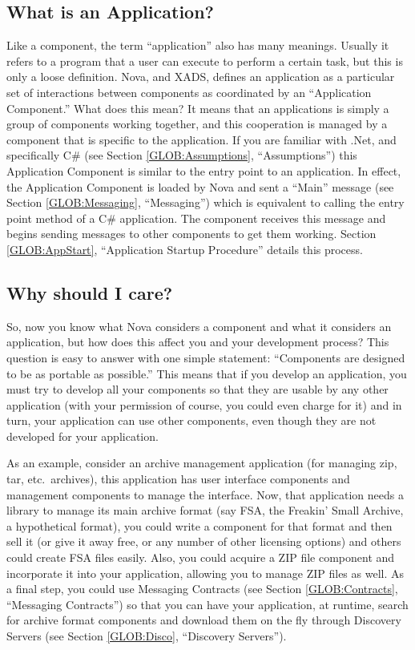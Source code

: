 \documentclass[a4paper,12pt]{article}
\begin{document}
\subsection{What is an Application?}
\label{SEC:OVR:App}
Like a component, the term ``application'' also has many meanings. Usually it refers to a program that a user can execute to perform a certain task, but this is only a loose definition. Nova, and XADS, defines an application as a particular set of interactions between components as coordinated by an ``Application Component.'' What does this mean? It means that an applications is simply a group of components working together, and this cooperation is managed by a component that is specific to the application. If you are familiar with .Net, and specifically C\# (see Section \ref{GLOB:Assumptions}, ``Assumptions'') this Application Component is similar to the entry point to an application. In effect, the Application Component is loaded by Nova and sent a ``Main'' message (see Section \ref{GLOB:Messaging}, ``Messaging'') which is equivalent to calling the entry point method of a C\# application. The component receives this message and begins sending messages to other components to get them working. Section \ref{GLOB:AppStart}, ``Application Startup Procedure'' details this process.

\subsection{Why should I care?}
\label{SEC:OVR:Care}
So, now you know what Nova considers a component and what it considers an application, but how does this affect you and your development process? This question is easy to answer with one simple statement: ``Components are designed to be as portable as possible.'' This means that if you develop an application, you must try to develop all your components so that they are usable by any other application (with your permission of course, you could even charge for it) and in turn, your application can use other components, even though they are not developed for your application. 

	As an example, consider an archive management application (for managing zip, tar, etc.\ archives), this application has user interface components and management components to manage the interface. Now, that application needs a library to manage its main archive format (say FSA, the Freakin' Small Archive, a hypothetical format), you could write a component for that format and then sell it (or give it away free, or any number of other licensing options) and others could create FSA files easily. Also, you could acquire a ZIP file component and incorporate it into your application, allowing you to manage ZIP files as well. As a final step, you could use Messaging Contracts (see Section \ref{GLOB:Contracts}, ``Messaging Contracts'') so that you can have your application, at runtime, search for archive format components and download them on the fly through Discovery Servers (see Section \ref{GLOB:Disco}, ``Discovery Servers'').
	
\end{document}
